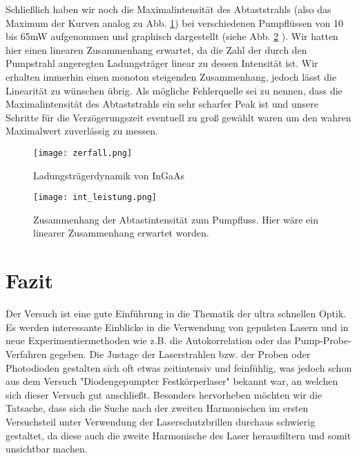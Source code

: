 \documentclass[a4paper,12pt]{scrartcl}
\begin{document}
Schließlich haben wir noch die Maximalintensität des Abtaststrahls (also das Maximum der Kurven analog zu Abb. \ref{zerfall}) bei verschiedenen Pumpflüssen von 10 bis 65mW aufgenommen und graphisch dargestellt (siehe Abb. \ref{int_leistung} ). Wir hatten hier einen linearen Zusammenhang erwartet, da die Zahl der durch den Pumpstrahl angeregten Ladungsträger linear zu dessen Intensität ist. Wir erhalten immerhin einen monoton steigenden Zusammenhang, jedoch lässt die Linearität zu wünschen übrig. Als mögliche Fehlerquelle sei zu nennen, dass die Maximalintensität des Abtaststrahls ein sehr scharfer Peak ist und unsere Schritte für die Verzögerungszeit eventuell zu groß gewählt waren um den wahren Maximalwert zuverlässig zu messen.

\begin{figure}[h]
	\begin{center}
		\texttt{[image: zerfall.png]}
		\caption{Ladungsträgerdynamik von InGaAs}
		\label{zerfall}
	\end{center}
\end{figure}

\begin{figure}[h]
	\begin{center}
		\texttt{[image: int\_leistung.png]}
		\caption{Zusammenhang der Abtastintensität zum Pumpfluss. Hier wäre ein linearer Zusammenhang erwartet worden.}
		\label{int_leistung}
	\end{center}
\end{figure}


\section{Fazit}
Der Versuch ist eine gute Einführung in die Thematik der ultra schnellen Optik. Es werden interessante Einblicke in die Verwendung von gepulsten Lasern und in neue Experimentiermethoden wie z.B. die Autokorrelation oder das Pump-Probe-Verfahren gegeben. Die Justage der Laserstrahlen bzw. der Proben oder Photodioden gestalten sich oft etwas zeitintensiv und feinfühlig, was jedoch schon aus dem Versuch "Diodengepumpter Festkörperlaser"{} bekannt war, an welchen sich dieser Versuch gut anschließt. Besonders hervorheben möchten wir die Tatsache, dass sich die Suche nach der zweiten Harmonischen im ersten Versuchsteil unter Verwendung der Laserschutzbrillen durchaus schwierig gestaltet, da diese auch die zweite Harmonische des Laser herausfiltern und somit unsichtbar machen. 
	
\end{document}
